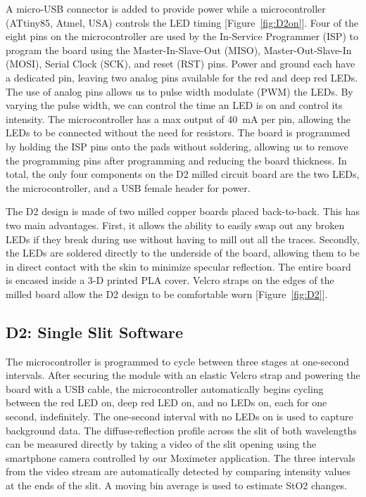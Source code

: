 A micro-USB connector is added to provide power while a microcontroller (ATtiny85, Atmel, USA) controls the LED timing [Figure~\ref{fig:D2on}]. Four of the eight pins on the microcontroller are used by the In-Service Programmer (ISP) to program the board using the Master-In-Slave-Out (MISO), Master-Out-Slave-In (MOSI), Serial Clock (SCK), and reset (RST) pins. Power and ground each have a dedicated pin, leaving two analog pins available for the red and deep red LEDs. The use of analog pins allows us to pulse width modulate (PWM) the LEDs. By varying the pulse width, we can control the time an LED is on and control its intensity. The microcontroller has a max output of 40~mA per pin, allowing the LEDs to be connected without the need for resistors. The board is programmed by holding the ISP pins onto the pads without soldering, allowing us to remove the programming pins after programming and reducing the board thickness. In total, the only four components on the D2 milled circuit board are the two LEDs, the microcontroller, and a USB female header for power. 

The D2 design is made of two milled copper boards placed back-to-back. This has two main advantages. First, it allows the ability to easily swap out any broken LEDs if they break during use without having to mill out all the traces. Secondly, the LEDs are soldered directly to the underside of the board, allowing them to be in direct contact with the skin to minimize specular reflection. The entire board is encased inside a 3-D printed PLA cover. Velcro straps on the edges of the milled board allow the D2 design to be comfortable worn [Figure~\ref{fig:D2}]. 

\subsection{D2: Single Slit Software}
The microcontroller is programmed to cycle between three stages at one-second intervals. After securing the module with an elastic Velcro strap and powering the board with a USB cable, the microcontroller automatically begins cycling between the red LED on, deep red LED on, and no LEDs on, each for one second, indefinitely. The one-second interval with no LEDs on is used to capture background data. The diffuse-reflection profile across the slit of both wavelengths can be measured directly by taking a video of the slit opening using the smartphone camera controlled by our Moximeter application. The three intervals from the video stream are automatically detected by comparing intensity values at the ends of the slit. A moving bin average is used to estimate StO2 changes. 

